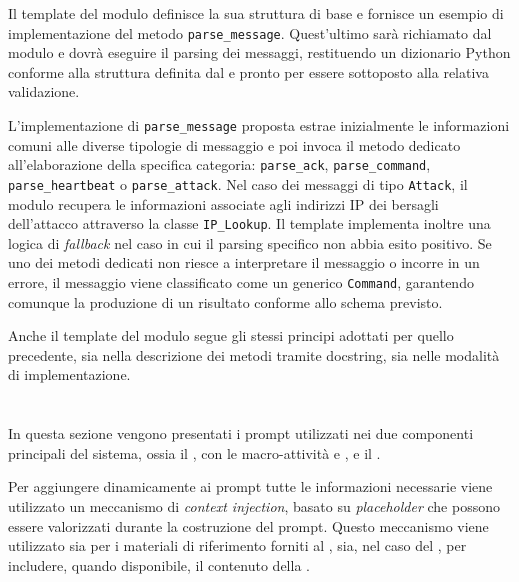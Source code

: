 Il template del modulo \parser{} definisce la sua struttura di base e fornisce un esempio di implementazione del metodo \texttt{parse\_message}. Quest'ultimo sarà richiamato dal modulo \botnet{} e dovrà eseguire il parsing dei messaggi, restituendo un dizionario Python conforme alla struttura definita dal \schema{} e pronto per essere sottoposto alla relativa validazione.

L'implementazione di \texttt{parse\_message} proposta estrae inizialmente le informazioni comuni alle diverse tipologie di messaggio e poi invoca il metodo dedicato all'elaborazione della specifica categoria: \texttt{parse\_ack}, \texttt{parse\_command}, \texttt{parse\_heartbeat} o \texttt{parse\_attack}. Nel caso dei messaggi di tipo \texttt{Attack}, il modulo recupera le informazioni associate agli indirizzi IP dei bersagli dell'attacco attraverso la classe \texttt{IP\_Lookup}. Il template implementa inoltre una logica di \emph{fallback} nel caso in cui il parsing specifico non abbia esito positivo. Se uno dei metodi dedicati non riesce a interpretare il messaggio o incorre in un errore, il messaggio viene classificato come un generico \texttt{Command}, garantendo comunque la produzione di un risultato conforme allo schema previsto.


Anche il template del modulo \parser{} segue gli stessi principi adottati per quello precedente, sia nella descrizione dei metodi tramite docstring, sia nelle modalità di implementazione.

\section{\prompt{}} \label{sec:prompt} %

In questa sezione vengono presentati i prompt utilizzati nei due componenti principali del sistema, ossia il \sreagent{}, con le macro-attività \renaming{} e \reversing{}, e il \codeagent{}.


Per aggiungere dinamicamente ai prompt tutte le informazioni necessarie viene utilizzato un meccanismo di \emph{context injection}, basato su \emph{placeholder} che possono essere valorizzati durante la costruzione del prompt. Questo meccanismo viene utilizzato sia per i materiali di riferimento forniti al \codeagent{}, sia, nel caso del \sreagent{}, per includere, quando disponibile, il contenuto della \kb{}.

